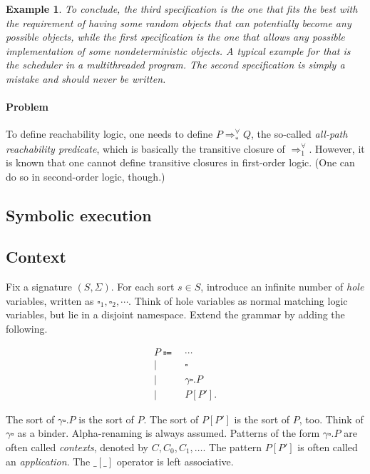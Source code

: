 \documentclass{article}
\theoremstyle{plain}
\newtheorem{eg}[thm]{Example}
\begin{document}
\begin{eg}
To conclude, the third specification is the one that fits the best with the requirement of having some random objects that can potentially become \emph{any} possible objects, while the first specification is the one that allows \emph{any} possible implementation of some nondeterministic objects. A typical example for that is the scheduler in a multithreaded program. The second specification is simply a mistake and should never be written.

\end{eg}

\paragraph{Problem} To define reachability logic, one needs to define $P \Rightarrow^{\forall}_{*} Q$, the so-called \emph{all-path reachability predicate}, which is basically the transitive closure of $\Rightarrow^{\forall}_1$. However, it is known that one cannot define transitive closures in first-order logic. (One can do so in second-order logic, though.)

\subsection{Symbolic execution}

\subsection{Context}

Fix a signature $(S, \Sigma)$. For each sort $s \in S$, introduce an infinite number of \emph{hole} variables, written as $\square_1, \square_2, \cdots$. Think of hole variables as normal matching logic variables, but lie in a disjoint namespace. Extend the grammar by adding the following.

\begin{align}
\label{ml_grammar}
P \Coloneqq\  & \cdots \nonumber \\
\mid\  & \square \nonumber \\
\mid\  & \gamma \square . P \nonumber \\
\mid\  & P[P'] . \nonumber
\end{align}

The sort of $\gamma \square . P$ is the sort of $P$. The sort of $P[P']$ is the sort of $P$, too. Think of $\gamma \square$ as a binder. Alpha-renaming is always assumed. Patterns of the form $\gamma \square . P$ are often called \emph{contexts}, denoted by $C, C_0, C_1, \dots$. The pattern $P[P']$ is often called an \emph{application}. The $\_[\_]$ operator is left associative.
\end{document}
